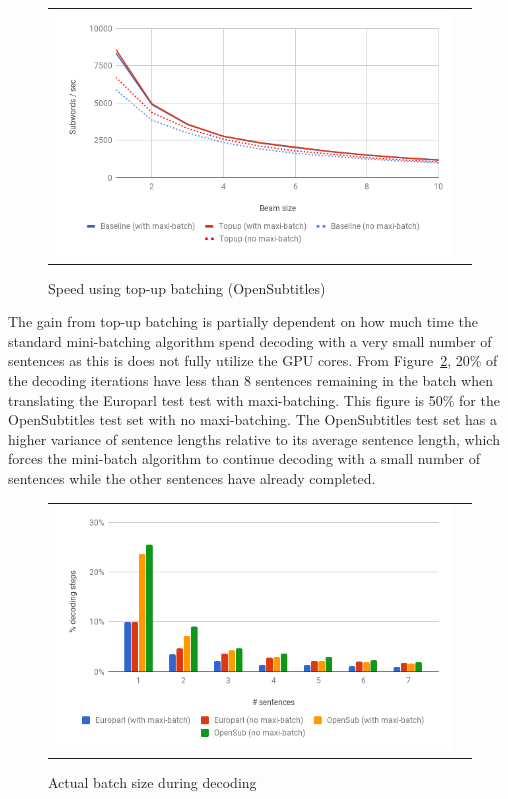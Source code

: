 \documentclass[11pt,a4paper]{article}
\begin{document}
\begin{figure}
\centering
\begin{tabular}{cc}
{\includegraphics[scale=0.3]{topup-opensubtitles.png}} 
\end{tabular}
\caption{Speed using top-up batching (OpenSubtitles)}
\label{fig:topup-opensubtitles}
\end{figure} 

The gain from top-up batching is partially dependent on how much time the standard mini-batching algorithm spend decoding with a very small number of sentences as this is does not fully utilize the GPU cores. From Figure~\ref{fig:batch-size-small}, 20\% of the decoding iterations have less than 8 sentences remaining in the batch when translating the Europarl test test with maxi-batching. This figure is 50\% for the OpenSubtitles test set with no maxi-batching. The OpenSubtitles test set has a higher variance of sentence lengths relative to its average sentence length, which forces the mini-batch algorithm to continue decoding with a small number of sentences while the other sentences have already completed.

\begin{figure}
\centering
\begin{tabular}{cc}
{\includegraphics[scale=0.3]{batch-size-small.png}} 
\end{tabular}
\caption{Actual batch size during decoding}
\label{fig:batch-size-small}
\end{figure} 
\end{document}

